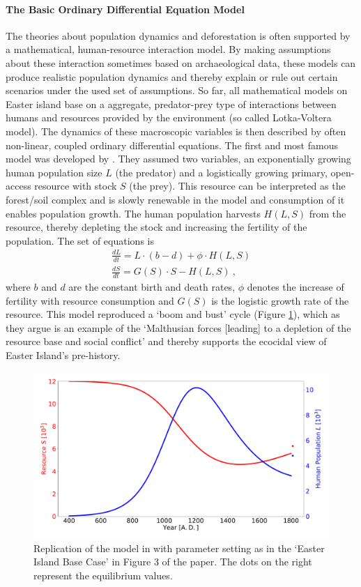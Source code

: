 \paragraph{The Basic Ordinary Differential Equation Model}
The theories about population dynamics and deforestation is often supported by a mathematical, human-resource interaction model.
By making assumptions about these interaction sometimes based on archaeological data, these models can produce realistic population dynamics and thereby explain or rule out certain scenarios under the used set of assumptions. 
So far, all mathematical models on Easter island base on a aggregate, predator-prey type of interactions between humans and resources provided by the environment (so called Lotka-Voltera model).
The dynamics of these macroscopic variables is then described by often non-linear, coupled ordinary differential equations.
The first and most famous model was developed by \citet{Brander1998}. 
They assumed two variables, an exponentially growing human population size $L$ (the predator) and a logistically growing primary, open-access resource with stock $S$ (the prey).
This resource can be interpreted as the forest/soil complex and is slowly renewable in the model and consumption of it enables population growth. 
The human population harvests $H(L,S)$ from the resource, thereby depleting the stock and increasing the fertility of the population.
The set of equations is
\begin{eqnarray}\label{eq:Brander}
\frac{dL}{dt} = L \cdot (b-d) + \phi \cdot H(L,S) \\
\frac{dS}{dt} = G(S)\cdot S - H(L,S) \ ,
\end{eqnarray}
where $b$ and $d$ are the constant birth and death rates, $\phi$ denotes the increase of fertility with resource consumption and $G(S)$ is the logistic growth rate of the resource.
This model reproduced a `boom and bust' cycle (Figure \ref{fig:brander1998eibasecase}), which as they argue is an example of the `Malthusian forces [leading] to a depletion of the resource base and social conflict' and thereby supports the ecocidal view of Easter Island's pre-history.
\begin{figure}
	\centering
	\includegraphics[width=1 \textwidth]{images/Brander1998_EIBaseCase}
	\caption{Replication of the model in \citet{Brander1998} with parameter setting as in the `Easter Island Base Case' in Figure 3 of the paper. The dots on the right represent the equilibrium values.}
	\label{fig:brander1998eibasecase}
\end{figure}

